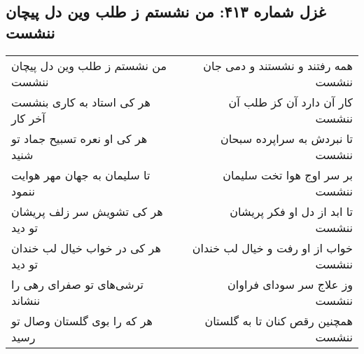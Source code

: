 \begin{center}
\section*{غزل شماره ۴۱۳: من نشستم ز طلب وین دل پیچان ننشست}
\label{sec:0413}
\begin{longtable}{l p{0.5cm} r}
من نشستم ز طلب وین دل پیچان ننشست
&&
همه رفتند و نشستند و دمی جان ننشست
\\
هر کی استاد به کاری بنشست آخر کار
&&
کار آن دارد آن کز طلب آن ننشست
\\
هر کی او نعره تسبیح جماد تو شنید
&&
تا نبردش به سراپرده سبحان ننشست
\\
تا سلیمان به جهان مهر هوایت ننمود
&&
بر سر اوج هوا تخت سلیمان ننشست
\\
هر کی تشویش سر زلف پریشان تو دید
&&
تا ابد از دل او فکر پریشان ننشست
\\
هر کی در خواب خیال لب خندان تو دید
&&
خواب از او رفت و خیال لب خندان ننشست
\\
ترشی‌های تو صفرای رهی را ننشاند
&&
وز علاج سر سودای فراوان ننشست
\\
هر که را بوی گلستان وصال تو رسید
&&
همچنین رقص کنان تا به گلستان ننشست
\\
\end{longtable}
\end{center}
